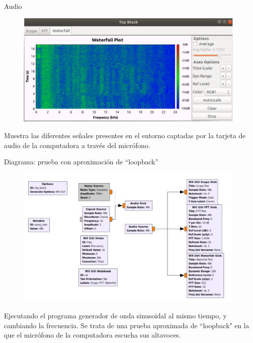 \begin{frame}{Audio}

\begin{figure}
\begin{center}
\vspace{-8mm}
\includegraphics[width=\textwidth]{parte1/lab3/pdf/lab3_8.pdf}
\end{center}
\end{figure}

Muestra las diferentes señales presentes en el entorno captadas por la tarjeta de audio de la computadora a través del micrófono.

\end{frame}

\begin{frame}{Diagrama: prueba con aproximación de “loopback”}

\begin{figure}
\begin{center}
\vspace{-6mm}
\includegraphics[width=\textwidth, height=0.6\paperheight]{parte1/lab3/pdf/lab3_9.pdf}
\end{center}
\end{figure}
\vspace{-5mm}
Ejecutando el programa generador de onda sinusoidal al mismo tiempo, y cambiando la frecuencia. Se trata de una prueba aproximada de “loopback" en la que el micrófono de la computadora escucha sus altavoces.

\end{frame}

